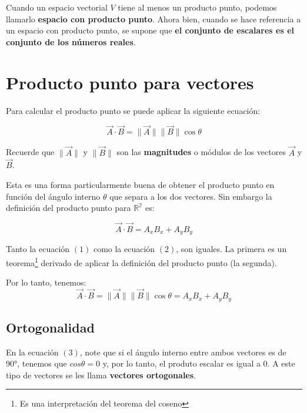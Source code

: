 \documentclass{article}
\begin{document}
    Cuando un espacio vectorial $V$ tiene al menos un producto punto, podemos llamarlo \textbf{espacio con producto punto}. Ahora bien, cuando se hace referencia a un espacio con producto punto, se supone que \textbf{el conjunto de escalares es el conjunto de los números reales}.


\section{Producto punto para vectores}

    Para calcular el producto punto se puede aplicar la siguiente ecuación:

    \begin{equation}
        \vec{A} \cdot \vec{B} = \parallel\vec{A}\parallel \parallel\vec{B}\parallel \cos \theta
    \end{equation}

    Recuerde que $\parallel\vec{A}\parallel$ y $\parallel\vec{B}\parallel$ son las \textbf{magnitudes} o módulos de los vectores $\vec{A}$ y $\vec{B}$.

    Esta es una forma particularmente buena de obtener el producto punto en función del ángulo interno $\theta$ que separa a los dos vectores. Sin embargo la definición del producto punto para $\mathbb{R^2}$ es:

    \begin{equation}
        \vec{A} \cdot \vec{B} = A_xB_x + A_yB_y
    \end{equation}

    Tanto la ecuación $(1)$ como la ecuación $(2)$, son iguales. La primera es un teorema\footnote{Es una interpretación del teorema del coseno} derivado de aplicar la definición del producto punto (la segunda).

    Por lo tanto, tenemos: 
    \begin{equation}
        \vec{A} \cdot \vec{B} = \parallel\vec{A}\parallel \parallel\vec{B}\parallel \cos \theta = A_xB_x + A_yB_y
    \end{equation}
    
    \subsection{Ortogonalidad}
    
        En la ecuación $(3)$, note que si el ángulo interno entre ambos vectores es de 90°, tenemos que $cos \theta = 0$ y, por lo tanto, el produto escalar es igual a $0$. A este tipo de vectores se les llama \textbf{vectores ortogonales}.
\end{document}
